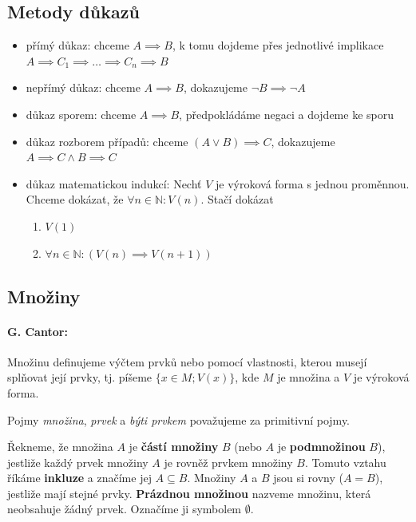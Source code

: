 \subsection{Metody důkazů}

\begin{itemize}
\item přímý důkaz: chceme $A\implies B$, k tomu dojdeme přes jednotlivé implikace $A\implies C_1 \implies \dots \implies C_n \implies B$
\item nepřímý důkaz: chceme $A\implies B$, dokazujeme $\neg B\implies \neg A$
\item důkaz sporem: chceme $A\implies B$, předpokládáme negaci a dojdeme ke sporu
\item důkaz rozborem případů: chceme $(A\lor B)\implies C$, dokazujeme $A\implies C\land B\implies C$
\item důkaz matematickou indukcí: Nechť $V$ je výroková forma s jednou proměnnou. Chceme dokázat, že $\forall n\in \mathbb N :V(n)$.
Stačí dokázat
\begin{enumerate}
	\item $V(1)$
	\item $\forall n\in \mathbb N : (V(n)\implies V(n+1))$
\end{enumerate}
\end{itemize}

\subsection{Množiny}

\paragraph{G. Cantor:} 
\par Množinu definujeme výčtem prvků nebo pomocí vlastnosti, kterou musejí splňovat její prvky, tj. píšeme
$\{x \in M ; V(x)\}$, kde $M$ je množina a $V$ je výroková forma.

\par Pojmy \textit{množina}, \textit{prvek} a \textit{býti prvkem} považujeme za primitivní pojmy.

\begin{definice}
Řekneme, že množina $A$ je \textbf{částí množiny} $B$ (nebo $A$ je \textbf{podmnožinou} $B$), jestliže každý prvek množiny $A$ je rovněž prvkem množiny $B$. Tomuto vztahu
říkáme \textbf{inkluze} a značíme jej $A \subseteq B$.
Množiny $A$ a $B$ jsou si rovny ($A = B$), jestliže mají stejné prvky.
\textbf{Prázdnou množinou} nazveme množinu, která neobsahuje žádný prvek. Označíme ji symbolem $\emptyset$.
\end{definice}


